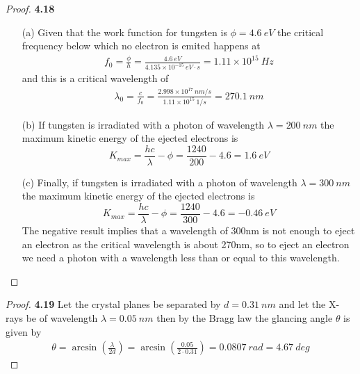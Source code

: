 \documentclass[11pt]{article}
\theoremstyle{definition}
\begin{document}
\begin{proof}{\textbf{4.18}}
    \begin{itemize}
        \item [(a)] Given that the work function for tungsten is $\phi= 4.6~eV$
        the critical frequency below which no electron is emited happens at
        \begin{align*}
            f_0 = \frac{\phi}{h}
            = \frac{4.6~eV}{4.135\times 10^{-15}~eV\cdot s}
            = 1.11 \times 10^{15}~Hz
        \end{align*}
        and this is a critical wavelength of
        \begin{align*}
            \lambda_0 = \frac{c}{f_0}
            = \frac{2.998\times 10^{17}~nm/s}{1.11\times 10^{15}~1/s}
            = 270.1~nm
        \end{align*}
        \item [(b)] If tungsten is irradiated with a photon of wavelength
        $\lambda = 200~nm$ the maximum kinetic energy of the ejected electrons
        is
        $$K_{max} = \frac{hc}{\lambda} - \phi = \frac{1240}{200} - 4.6 = 1.6~eV$$
        \item [(c)] Finally, if tungsten is irradiated with a photon of
        wavelength $\lambda = 300~nm$ the maximum kinetic energy of the ejected
        electrons is
        $$K_{max} = \frac{hc}{\lambda} - \phi = \frac{1240}{300} - 4.6 = -0.46~eV$$
        The negative result implies that a wavelength of 300nm
        is not enough to eject an electron as the critical wavelength is about
        270nm, so to eject an electron we need a photon with a wavelength
        less than or equal to this wavelength.
    \end{itemize}
\end{proof}
\begin{proof}{\textbf{4.19}}
    Let the crystal planes be separated by $d= 0.31~nm$ and let the X-rays
    be of wavelength $\lambda = 0.05~nm$ then by the Bragg law the glancing
    angle $\theta$ is given by
    \begin{align*}
        \theta = \arcsin(\frac{\lambda}{2d})
        = \arcsin(\frac{0.05}{2\cdot 0.31}) = 0.0807~rad = 4.67~deg
    \end{align*}
\end{proof}
\cleardoublepage
\end{document}
